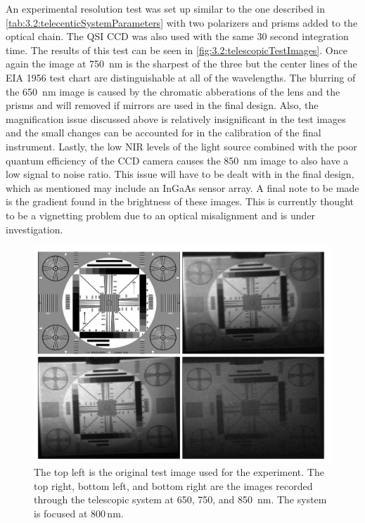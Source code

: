 An experimental resolution test was set up similar to the one described in \autoref{tab:3.2:telecenticSystemParameters} with two polarizers and prisms added to the optical chain. The QSI CCD was also used with the same 30 second integration time. The results of this test can be seen in \autoref{fig:3.2:telescopicTestImages}. Once again the image at 750~nm is the sharpest of the three but the center lines of the EIA 1956 test chart are distinguishable at all of the wavelengths. The blurring of the 650~nm image is caused by the chromatic abberations of the lens and the prisms and will removed if mirrors are used in the final design. Also, the magnification issue discussed above is relatively insignificant in the test images and the small changes can be accounted for in the calibration of the final instrument. Lastly, the low NIR levels of the light source combined with the poor quantum efficiency of the CCD camera causes the 850~nm image to also have a low signal to noise ratio. This issue will have to be dealt with in the final design, which as mentioned may include an InGaAs sensor array. A final note to be made is the gradient found in the brightness of these images. This is currently thought to be a vignetting problem due to an optical misalignment and is under investigation.

\begin{figure}
    \begin{center}
    \includegraphics[width=1.0\textwidth]{./Images/3-2-TelescopicTestImages.pdf}
    \caption[Telescoptic Prototype Laboratory Test Images]{The top left is the original test image used for the experiment. The top right, bottom left, and bottom right are the images recorded through the telescopic system at 650, 750, and 850~nm. The system is focused at 800\,nm.}
   \label{fig:3.2:telescopicTestImages}
    \end{center}
\end{figure}

